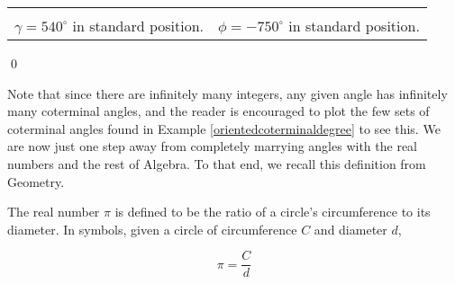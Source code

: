 \documentclass[12pt]{ximera}
\begin{document}
\begin{example}
\begin{enumerate}
\begin{center}
\begin{tabular}{cc}
\scriptsize
\normalsize
 

\\

$\gamma = 540^{\circ}$ in standard position. & \hspace{1in} $\phi = -750^{\circ}$ in standard position.   \\

\end{tabular}

\end{center}

\end{enumerate}
\qed

\end{example}


Note that since there are infinitely many integers, any given angle has infinitely many coterminal angles, and the reader is encouraged to plot the few sets of coterminal angles found in Example \ref{orientedcoterminaldegree} to see this.  We are now just one step away from completely marrying angles with the real numbers and the rest of Algebra.  To that end, we recall this definition from Geometry.

\smallskip


\begin{definition} \label{pidefn}  The real number $\pi$ is defined to be the ratio of a circle's circumference to its diameter.  In symbols, given a circle of circumference $C$ and diameter $d$, 

\[ \pi = \dfrac{C}{d} \]

\end{definition}
\end{document}
